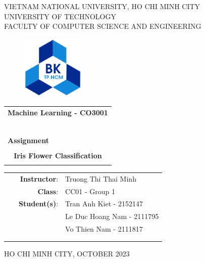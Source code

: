 \documentclass[a4paper]{article}
\begin{document}
\begin{titlepage}
\begin{center}
VIETNAM NATIONAL UNIVERSITY, HO CHI MINH CITY \\
UNIVERSITY OF TECHNOLOGY \\
FACULTY OF COMPUTER SCIENCE AND ENGINEERING
\end{center}

\vspace{1cm}

\begin{figure}[h!]
\begin{center}
\includegraphics[width=3cm]{hcmut.png}
\end{center}
\end{figure}

\vspace{1cm}


\begin{center}
\begin{tabular}{c}
\multicolumn{1}{l}{\textbf{{\Large Machine Learning - CO3001}}}\\
~~\\
\hline
\\
\multicolumn{1}{l}{\textbf{{\Large Assignment}}}\\
\\
\textbf{{\Huge Iris Flower Classification}}\\
\\
\hline
\end{tabular}
\end{center}

\vspace{3cm}

\begin{table}[h]
\begin{tabular}{rrl}
\hspace{3 cm} & \textbf{{\ Instructor}}: & Truong Thi Thai Minh \\
\hspace{3 cm} & \textbf{{\ Class}}: & CC01 - Group 1 \\
\hspace{3 cm} & \textbf{{\ Student(s)}}: 
& Tran Anh Kiet - 2152147 \\ 
& &  Le Duc Hoang Nam - 2111795\\
& &  Vo Thien Nam - 2111817\\

& &   \\
& &   \\
\end{tabular}
\end{table}

\begin{center}
{\footnotesize HO CHI MINH CITY, OCTOBER 2023}
\end{center}
\end{titlepage}
\end{document}
